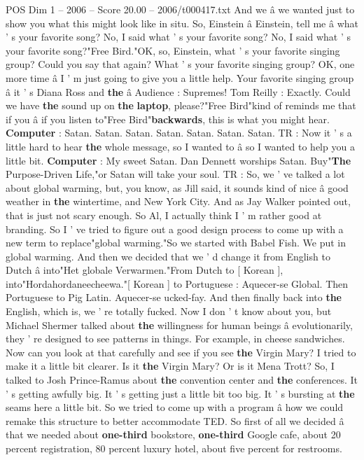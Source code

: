 \begin{textsample}{POS Dim 1 – 2006 – Score 20.00 – 2006/t000417.txt}
And we â we wanted just to show you what this might look like in situ.
So, Einstein â Einstein, tell me â what ' s your favorite song?
No, I said what ' s your favorite song?
No, I said what ' s your favorite song?"Free Bird."OK, so, Einstein, what ' s your favorite singing group?
Could you say that again?
What ' s your favorite singing group?
OK, one more time â I ' m just going to give you a little help.
Your favorite singing group â it ' s Diana Ross and \textbf{the} â Audience : Supremes!
Tom Reilly : Exactly.
Could we have \textbf{the} sound up on \textbf{the} \textbf{laptop}, please?"Free Bird"kind of reminds me that if you â if you listen to"Free Bird"\textbf{backwards}, this is what you might hear. \textbf{Computer} : Satan.
Satan.
Satan.
Satan.
Satan.
Satan.
Satan.
TR : Now it ' s a little hard to hear \textbf{the} whole message, so I wanted to â so I wanted to help you a little bit. \textbf{Computer} : My sweet Satan.
Dan Dennett worships Satan.
Buy"\textbf{The} Purpose-Driven Life,"or Satan will take your soul.
TR : So, we ' ve talked a lot about global warming, but, you know, as Jill said, it sounds kind of nice â good weather in \textbf{the} wintertime, and New York City.
And as Jay Walker pointed out, that is just not scary enough.
So Al, I actually think I ' m rather good at branding.
So I ' ve tried to figure out a good design process to come up with a new term to replace"global warming."So we started with Babel Fish.
We put in global warming.
And then we decided that we ' d change it from English to Dutch â into"Het globale Verwarmen."From Dutch to [ Korean ], into"Hordahordaneecheewa."[ Korean ] to Portuguese : Aquecer-se Global.
Then Portuguese to Pig Latin.
Aquecer-se ucked-fay.
And then finally back into \textbf{the} English, which is, we ' re totally fucked.
Now I don ' t know about you, but Michael Shermer talked about \textbf{the} willingness for human beings â evolutionarily, they ' re designed to see patterns in things.
For example, in cheese sandwiches.
Now can you look at that carefully and see if you see \textbf{the} Virgin Mary?
I tried to make it a little bit clearer.
Is it \textbf{the} Virgin Mary?
Or is it Mena Trott?
So, I talked to Josh Prince-Ramus about \textbf{the} convention center and \textbf{the} conferences.
It ' s getting awfully big.
It ' s getting just a little bit too big.
It ' s bursting at \textbf{the} seams here a little bit.
So we tried to come up with a program â how we could remake this structure to better accommodate TED.
So first of all we decided â that we needed about \textbf{one-third} bookstore, \textbf{one-third} Google cafe, about 20 percent registration, 80 percent luxury hotel, about five percent for restrooms.

\end{textsample}
